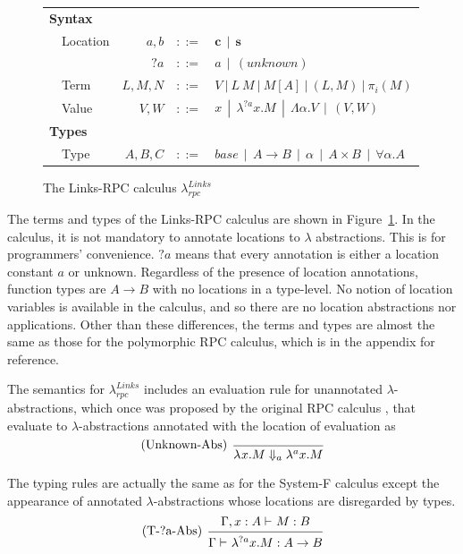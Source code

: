 \documentclass[a4paper]{article}
\theoremstyle{plain}
\theoremstyle{definition}
\newcommand{\ruleverticalsep}{0.5cm}
\newcommand{\linksrpc}{$\lambda_{rpc}^{Links}$\xspace}
\newcommand{\client}{\textbf{c}}
\newcommand{\server}{\textbf{s}}
\newcommand{\evalRPC}[3]{#1\Downarrow_{#2}#3}
\newcommand{\lamL}[3]{\lambda^{#1}#2.#3}
\newcommand{\tyenv}{\Gamma}
\newcommand{\tyenvExt}[2]{\Gamma,#1:#2}
\newcommand{\typing}[4]{#1\vdash_{#2} #3 : #4}
\begin{document}
\begin{figure}[h]
\centering  
\begin{tabular}{ l  l  r  c  l }
\multicolumn{5}{l}{\textbf{Syntax}} \\
 & Location & $a,b$   & $::=$ & $\client \ \ | \  \  \server$ \\
 &          & $?a$    & $::=$  & $a  \ \ |  \ \ (unknown) $ \\
 & Term     & $L,M,N$ & $::=$  & $V  \ | \  L \ M  \ | \  M[A]  \ | \  (L,M)  \ |  \ \pi_i(M)$ \\
 & Value & $V,W$ & $::=$ & $x  \ \ |  \ \ \lambda^{?a} x.M  \ \ |  \ \ \Lambda\alpha.V  \ \ |  \ \ (V,W)$
\\[\ruleverticalsep]
\multicolumn{5}{l}{\textbf{Types}} \\
& Type & $A,B,C$ & $::=$
& $base  \ \ | \ \  A \rightarrow B  \ \ | \ \  \alpha  \ \ | \ \  A \times B  \ \ | \ \  \forall\alpha.A$
\end{tabular}
\caption{The Links-RPC calculus \linksrpc}
\label{fig:linksrpc}
\end{figure}

The terms and types of the Links-RPC calculus are shown in
Figure~\ref{fig:linksrpc}.
%
In the calculus, it is not mandatory to annotate locations to
$\lambda$ abstractions. This is for programmers' convenience.
%
$?a$ means that every annotation is either a location constant $a$ or
unknown.
%
Regardless of the presence of location annotations, function types are
$A \rightarrow B$ with no locations in a type-level.
%
No notion of location variables is available in the calculus, and so
there are no location abstractions nor applications.
%
Other than these differences, the terms and types are almost the same
as those for the polymorphic RPC calculus, which
is in the appendix for reference.
%


The semantics for \linksrpc includes an evaluation rule for
unannotated $\lambda$-abstractions, which once was proposed by the
original RPC calculus \cite{Cooper:2009:RC:1599410.1599439}, that
evaluate to $\lambda$-abstractions annotated with the location of
evaluation as
\[
\begin{prooftree}
  \infer[left label=(Unknown-Abs)]0{ \evalRPC{\lamL{}{x}{M}}{a}{\lamL{a}{x}{M} }}
\end{prooftree}
\]
%

The typing rules are actually the same as for the System-F calculus
except the appearance of annotated $\lambda$-abstractions whose
locations are disregarded by types.
%
\[
\begin{prooftree}
  \hypo{ \typing{\tyenvExt{x}{A}}{}{M}{B} }
  \infer[left label=(T-?a-Abs)]1{ \typing{\tyenv}{}{\lamL{?a}{x}{M}}{A \rightarrow B} }
\end{prooftree}
\]
\end{document}
